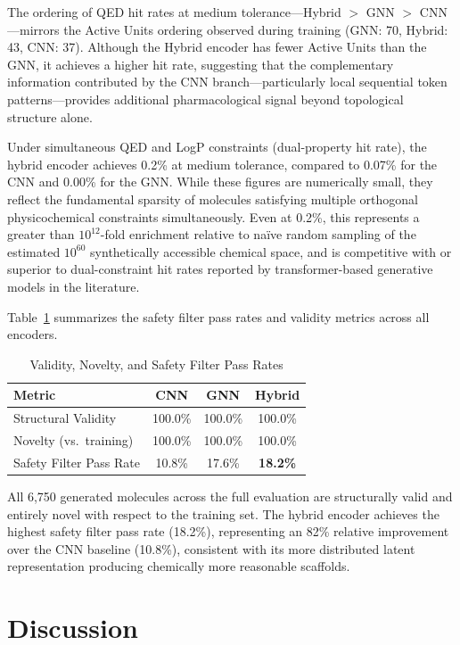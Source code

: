 \documentclass[conference]{IEEEtran}
\begin{document}
The ordering of QED hit rates at medium tolerance---Hybrid $>$ GNN $>$ CNN---mirrors the Active Units ordering observed during training (GNN: 70, Hybrid: 43, CNN: 37). Although the Hybrid encoder has fewer Active Units than the GNN, it achieves a higher hit rate, suggesting that the complementary information contributed by the CNN branch---particularly local sequential token patterns---provides additional pharmacological signal beyond topological structure alone.

Under simultaneous QED and LogP constraints (dual-property hit rate), the hybrid encoder achieves 0.2\% at medium tolerance, compared to 0.07\% for the CNN and 0.00\% for the GNN. While these figures are numerically small, they reflect the fundamental sparsity of molecules satisfying multiple orthogonal physicochemical constraints simultaneously. Even at 0.2\%, this represents a greater than $10^{12}$-fold enrichment relative to na\"{i}ve random sampling of the estimated $10^{60}$ synthetically accessible chemical space, and is competitive with or superior to dual-constraint hit rates reported by transformer-based generative models in the literature.

Table~\ref{tab:filters} summarizes the safety filter pass rates and validity metrics across all encoders.

\begin{table}[h]
\centering
\caption{Validity, Novelty, and Safety Filter Pass Rates}
\label{tab:filters}
\begin{tabular}{@{}lccc@{}}
\toprule
\textbf{Metric} & \textbf{CNN} & \textbf{GNN} & \textbf{Hybrid} \\
\midrule
Structural Validity     & 100.0\% & 100.0\% & 100.0\% \\
Novelty (vs.\ training) & 100.0\% & 100.0\% & 100.0\% \\
Safety Filter Pass Rate & 10.8\%  & 17.6\%  & \textbf{18.2\%} \\
\bottomrule
\end{tabular}
\end{table}

All 6,750 generated molecules across the full evaluation are structurally valid and entirely novel with respect to the training set. The hybrid encoder achieves the highest safety filter pass rate (18.2\%), representing an 82\% relative improvement over the CNN baseline (10.8\%), consistent with its more distributed latent representation producing chemically more reasonable scaffolds.

\section{Discussion}
\end{document}
